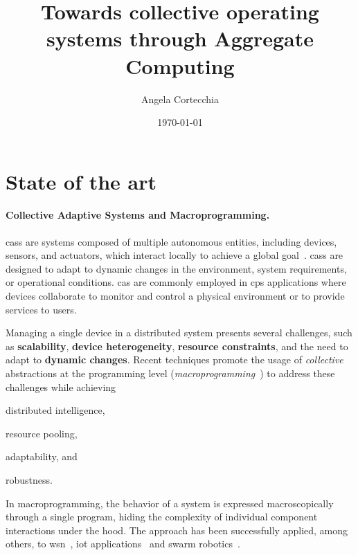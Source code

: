 \documentclass[12pt, a4paper]{article}
\newenvironment{inlinelist}{\begin{enumerate*}[label=\emph{(\roman*)}]}{\end{enumerate*}}
\begin{document}
\title{Towards collective operating systems through Aggregate Computing}

\author{Angela Cortecchia}
\date{\today}
\maketitle


\section{State of the art}
\label{sec:state-of-the-art}

\sloppypar
\paragraph{Collective Adaptive Systems and Macroprogramming.}
\acp{cas} are systems composed of multiple autonomous entities,
including devices, sensors, and actuators, which interact locally to achieve a global goal~\cite{DBLP:conf/huc/Ferscha15}.
%
\acp{cas} are designed to adapt to dynamic changes in the environment, system requirements, or operational conditions.
%
\ac{cas} are commonly employed in \ac{cps} applications where devices collaborate to monitor and control a
physical environment or to provide services to users.

Managing a single device in a distributed system presents several challenges,
such as \textbf{scalability}, \textbf{device heterogeneity},
\textbf{resource constraints}, and the need to adapt to \textbf{dynamic changes}.
%
Recent techniques promote the usage of \emph{collective} abstractions at the programming level
(\emph{macroprogramming}~\cite{casadei22}) to address these challenges while achieving
\begin{inlinelist}
    \item distributed intelligence,
    \item resource pooling,
    \item adaptability, and
    \item robustness.
\end{inlinelist}
%
In macroprogramming, the behavior of a system is expressed macroscopically through a single program,
hiding the complexity of individual component interactions under the hood.
%
The approach has been successfully applied, among others, to
\ac{wsn}~\cite{DBLP:conf/ipsn/NewtonAW05},
\ac{iot} applications~\cite{noor19,mizzi18}
and
swarm robotics~\cite{DBLP:journals/software/PinciroliB16}.
\end{document}
